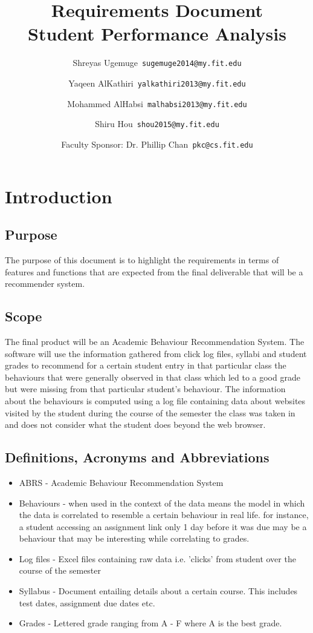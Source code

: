 \documentclass[12pt]{article}
\title{\textbf{Requirements Document} \\ \hfill \break
	Student Performance Analysis}
\author{Shreyas Ugemuge\      \texttt{sugemuge2014@my.fit.edu}
  \and
  Yaqeen AlKathiri\      \texttt{yalkathiri2013@my.fit.edu}
  \and
	Mohammed AlHabsi\      \texttt{malhabsi2013@my.fit.edu}
  \and
  Shiru Hou\      \texttt{shou2015@my.fit.edu}
  \and
  Faculty Sponsor: Dr. Phillip Chan\      \texttt{pkc@cs.fit.edu}}
\begin{document}
	\singlespacing
	\maketitle \pagebreak \tableofcontents \pagebreak
	\section{Introduction}
	\subsection{Purpose} \label{purpose}
	The purpose of this document is to highlight the requirements in terms of features and functions that are expected from the final deliverable that will be a recommender system. 
	\subsection{Scope} \label{scope}
	The final product will be an Academic Behaviour Recommendation System. The software will use the information gathered from click log files, syllabi and student grades to recommend for a certain student entry in that particular class the behaviours that were generally observed in that class which led to a good grade but were missing from that particular student's behaviour. The information about the behaviours is computed using a log file containing data about websites visited by the student during the course of the semester the class was taken in and does not consider what the student does beyond the web browser.
	\subsection{Definitions, Acronyms and Abbreviations} \label{defs}
	\begin{itemize}
		\item ABRS - Academic Behaviour Recommendation System
		\item Behaviours - when used in the context of the data means the model in which the data is correlated to resemble a certain behaviour in real life. for instance, a student accessing an assignment link only 1 day before it was due may be a behaviour that may be interesting while correlating to grades. 
		\item Log files - Excel files containing raw data i.e. 'clicks' from student over the course of the semester
		\item Syllabus - Document entailing details about a certain course. This includes test dates, assignment due dates etc.
		\item Grades - Lettered grade ranging from A - F where A is the best grade.
	\end{itemize}
\end{document}
